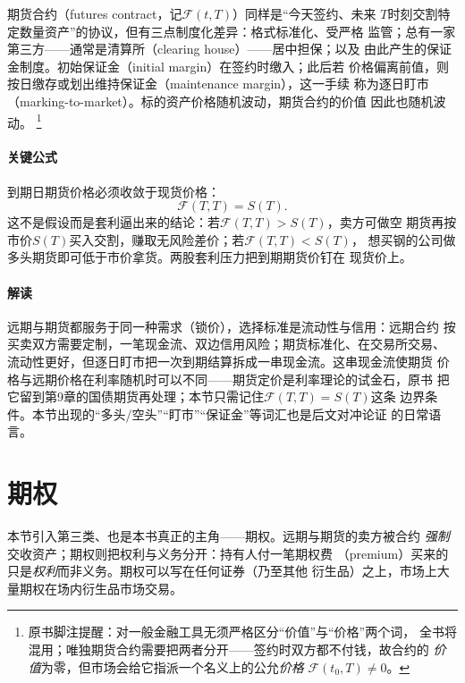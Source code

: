 期货合约（futures contract，记$\mathcal{F}(t,T)$）同样是“今天签约、未来
$T$时刻交割特定数量资产”的协议，但有三点制度化差异：格式标准化、受严格
监管；总有一家第三方——通常是清算所（clearing house）——居中担保；以及
由此产生的保证金制度。初始保证金（initial margin）在签约时缴入；此后若
价格偏离前值，则按日缴存或划出维持保证金（maintenance margin），这一手续
称为逐日盯市（marking-to-market）。标的资产价格随机波动，期货合约的价值
因此也随机波动。
\footnote{原书脚注提醒：对一般金融工具无须严格区分“价值”与“价格”两个词，
全书将混用；唯独期货合约需要把两者分开——签约时双方都不付钱，故合约的
\emph{价值}为零，但市场会给它指派一个名义上的公允\emph{价格}
$\mathcal{F}(t_0,T)\neq 0$。}

\paragraph{关键公式}
到期日期货价格必须收敛于现货价格：
\begin{equation*}
\mathcal{F}(T,T)=S(T).
\end{equation*}
这不是假设而是套利逼出来的结论：若$\mathcal{F}(T,T)>S(T)$，卖方可做空
期货再按市价$S(T)$买入交割，赚取无风险差价；若$\mathcal{F}(T,T)<S(T)$，
想买钢的公司做多头期货即可低于市价拿货。两股套利压力把到期期货价钉在
现货价上。


\paragraph{解读}
远期与期货都服务于同一种需求（锁价），选择标准是流动性与信用：远期合约
按买卖双方需要定制，一笔现金流、双边信用风险；期货标准化、在交易所交易、
流动性更好，但逐日盯市把一次到期结算拆成一串现金流。这串现金流使期货
价格与远期价格在利率随机时可以不同——期货定价是利率理论的试金石，原书
把它留到第9章的国债期货再处理；本节只需记住$\mathcal{F}(T,T)=S(T)$这条
边界条件。本节出现的“多头/空头”“盯市”“保证金”等词汇也是后文对冲论证
的日常语言。

\section{期权}

本节引入第三类、也是本书真正的主角——期权。远期与期货的卖方被合约
\emph{强制}交收资产；期权则把权利与义务分开：持有人付一笔期权费
（premium）买来的只是\emph{权利}而非义务。期权可以写在任何证券（乃至其他
衍生品）之上，市场上大量期权在场内衍生品市场交易。

